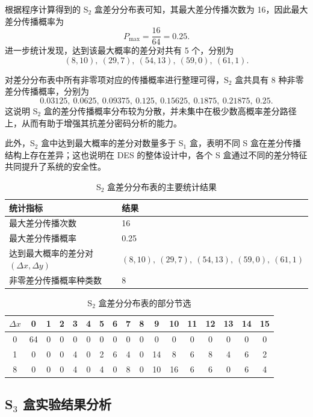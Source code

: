 根据程序计算得到的 S$_2$ 盒差分分布表可知，其最大差分传播次数为 16，因此最大差分传播概率为
\[
P_{\max}=\frac{16}{64}=0.25.
\]
进一步统计发现，达到该最大概率的差分对共有 5 个，分别为
\[
(8,10),\ (29,7),\ (54,13),\ (59,0),\ (61,1).
\]

对差分分布表中所有非零项对应的传播概率进行整理可得，S$_2$ 盒共具有 8 种非零差分传播概率，分别为
\[
0.03125,\ 0.0625,\ 0.09375,\ 0.125,\ 0.15625,\ 0.1875,\ 0.21875,\ 0.25.
\]
这说明 S$_2$ 盒的差分传播概率分布较为分散，并未集中在极少数高概率差分路径上，从而有助于增强其抗差分密码分析的能力。

此外，S$_2$ 盒中达到最大概率的差分对数量多于 S$_1$ 盒，表明不同 S 盒在差分传播结构上存在差异；这也说明在 DES 的整体设计中，各个 S 盒通过不同的差分特征共同提升了系统的安全性。
\begin{table}[H]
    \centering
    \caption{S$_2$ 盒差分分布表的主要统计结果}
    \label{tab:s2-summary}
    \begin{tabular}{p{6cm}p{8cm}}
        \hline
        统计指标 & 结果 \\
        \hline
        最大差分传播次数 & 16 \\
        最大差分传播概率 & 0.25 \\
        达到最大概率的差分对 $(\Delta x,\Delta y)$ 
        & $(8,10),\ (29,7),\ (54,13),\ (59,0),\ (61,1)$ \\
        非零差分传播概率种类数 & 8 \\
        \hline
    \end{tabular}
\end{table}
\begin{table}[H]
    \centering
    \caption{S$_2$ 盒差分分布表的部分节选}
    \label{tab:s2-ddt-sample}
    \scriptsize
    \setlength{\tabcolsep}{4pt}
    \begin{tabular}{c|cccccccccccccccc}
        \hline
        $\Delta x$ & 0 & 1 & 2 & 3 & 4 & 5 & 6 & 7 & 8 & 9 & 10 & 11 & 12 & 13 & 14 & 15 \\
        \hline
        0 & 64 & 0 & 0 & 0 & 0 & 0 & 0 & 0 & 0 & 0 & 0 & 0 & 0 & 0 & 0 & 0 \\
        1 & 0 & 0 & 0 & 4 & 0 & 2 & 6 & 4 & 0 & 14 & 8 & 6 & 8 & 4 & 6 & 2 \\
        8 & 0 & 0 & 0 & 4 & 0 & 4 & 0 & 8 & 0 & 10 & 16 & 6 & 6 & 0 & 6 & 4 \\
        \hline
    \end{tabular}
\end{table}
\subsection{S$_3$ 盒实验结果分析}

